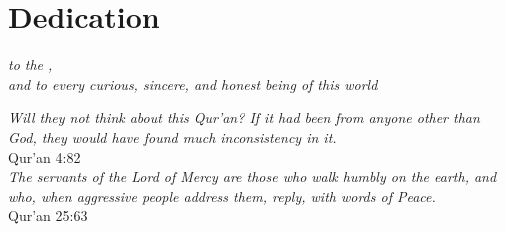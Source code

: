 \chapter*{Dedication}
\begin{center}
    \textit{to the  \textup{},\\and to every curious, sincere, and honest being of this world}
    \begin{minipage}{.6\linewidth}
        \centering
        \vspace{4cm}
        \textit{Will they not think about this Qur'an? If it had been from anyone other than God, they would have found much inconsistency in it.}\\
        {\sc Qur'an 4:82}\\[3cm]
        \textit{The servants of the Lord of Mercy are those who walk humbly on the earth, and who, when aggressive people address them, reply, with words of Peace.}\\
        {\sc Qur'an 25:63}\\[1cm]
    \end{minipage}
\end{center}
